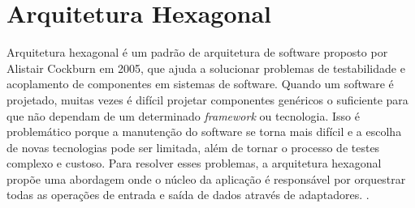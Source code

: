 






\section{Arquitetura Hexagonal}
\label{sec:arquiteturaHexagonal}

Arquitetura hexagonal é um padrão de arquitetura de software proposto por Alistair Cockburn em 2005, que ajuda a solucionar problemas de testabilidade e acoplamento de componentes em sistemas de software. Quando um software é projetado, muitas vezes é difícil projetar componentes genéricos o suficiente para que não dependam de um determinado \textit{framework} ou tecnologia. Isso é problemático porque a manutenção do software se torna mais difícil e a escolha de novas tecnologias pode ser limitada, além de tornar o processo de testes complexo e custoso. Para resolver esses problemas, a arquitetura hexagonal propõe uma abordagem onde o núcleo da aplicação é responsável por orquestrar todas as operações de entrada e saída de dados através de adaptadores. \citep{cockburn2017}.

